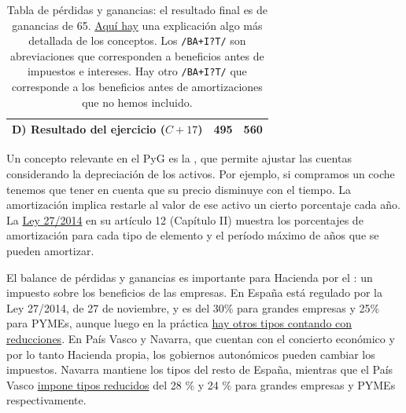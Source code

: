 \documentclass[nochap,palatino,shortheader]{apuntes}
\newcommand{\study}[1]{#1} \newcommand{\substudy}[1]{#1}
\begin{document}
\begin{table}[hbtp]
\begin{minipage}{\textwidth}
\begin{tabular}{l|c|c}
\textbf{D) Resultado del ejercicio} ($C + 17$) & \textbf{495} & \textbf{560} \\ \bottomrule
\end{tabular}
\caption{Tabla de pérdidas y ganancias: el resultado final es de ganancias de 65. \href{http://www.plangeneralcontable.com/?tit=guia-del-pgc-de-pymes&name=GeTia&contentId=man_pgcpym&manPage=26}{Aquí hay} una explicación algo más detallada de los conceptos. Los \texttt{/BA+I?T/} son abreviaciones que corresponden a beneficios antes de impuestos e intereses. Hay otro \texttt{/BA+I?T/} que corresponde a los beneficios antes de amortizaciones que no hemos incluido.}
\label{tab:PyG}
\end{minipage}
\end{table}

Un concepto relevante en el PyG es la , que permite \substudy{ajustar las cuentas} considerando la \study{depreciación de los activos}. 
Por ejemplo, si compramos un coche tenemos que tener en cuenta que su precio disminuye con el tiempo. 
La amortización implica \substudy{restarle al valor de ese activo un cierto porcentaje cada año}. 
La \href{http://www.boe.es/diario_boe/txt.php?id=BOE-A-2014-12328}{Ley 27/2014} en su artículo 12 (Capítulo II) muestra los \substudy{porcentajes de amortización para cada tipo de elemento y el período máximo de años} que se pueden amortizar.

El balance de pérdidas y ganancias es importante para Hacienda por el : un \substudy{impuesto sobre los beneficios} de las empresas. 
En España está regulado por la Ley 27/2014, de 27 de noviembre, y es del \substudy{30\% para grandes} empresas y \substudy{25\% para PYMEs}, \substudy{aunque} luego en la práctica \href{http://www.agenciatributaria.es/AEAT.internet/Inicio/_Segmentos_/Empresas_y_profesionales/Empresas/Impuesto_sobre_Sociedades/Periodos_impositivos_iniciados_hasta_31_12_2014/Tipos_de_gravamen_aplicables_a_periodos_impositivos_iniciados_en_el_ano_2013_y_2014.shtml}{\substudy{hay} otros tipos contando con \substudy{reducciones}}. 
En País Vasco y Navarra, que cuentan con el \substudy{concierto económico} y por lo tanto Hacienda propia, los gobiernos autonómicos pueden cambiar los impuestos. Navarra mantiene los tipos del resto de España, mientras que el País Vasco \href{http://www.ogasun.ejgv.euskadi.eus/r51-341/es/contenidos/informacion/6901/es_2316/es_12215.html}{impone tipos reducidos} del 28 \% y 24 \% para grandes empresas y PYMEs respectivamente.
\end{document}
